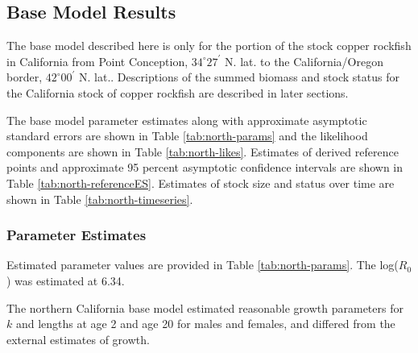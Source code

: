 \documentclass[11pt,
  english,
  letterpaper,
]{article}
\begin{document}
\newcommand{\lt}{\ensuremath <}
\newcommand{\gt}{\ensuremath >}

\linenumbers

\newcommand\CapeM{$40^\circ 10^\prime$ N. lat.}
\newcommand\PtC{$34^\circ 27^\prime$ N. lat.}
\newcommand\CAOR{$42^\circ 00^\prime$ N. lat.}

\hypertarget{base-model-results}{%
\subsection{Base Model Results}\label{base-model-results}}

The base model described here is only for the portion of the stock copper rockfish in California from Point Conception, $34^\circ 27^\prime$ N. lat. to the California/Oregon border, $42^\circ 00^\prime$ N. lat.. Descriptions of the summed biomass and stock status for the California stock of copper rockfish are described in later sections.

The base model parameter estimates along with approximate asymptotic standard errors are shown in Table \ref{tab:north-params} and the likelihood components are shown in Table \ref{tab:north-likes}. Estimates of derived reference points and approximate 95 percent asymptotic confidence intervals are shown in Table \ref{tab:north-referenceES}. Estimates of stock size and status over time are shown in Table \ref{tab:north-timeseries}.

\hypertarget{parameter-estimates}{%
\subsubsection{Parameter Estimates}\label{parameter-estimates}}

Estimated parameter values are provided in Table \ref{tab:north-params}. The log(\(R_0\)) was estimated at 6.34.

The northern California base model estimated reasonable growth parameters for \(k\) and lengths at age 2 and age 20 for males and females, and differed from the external estimates of growth.
\end{document}
